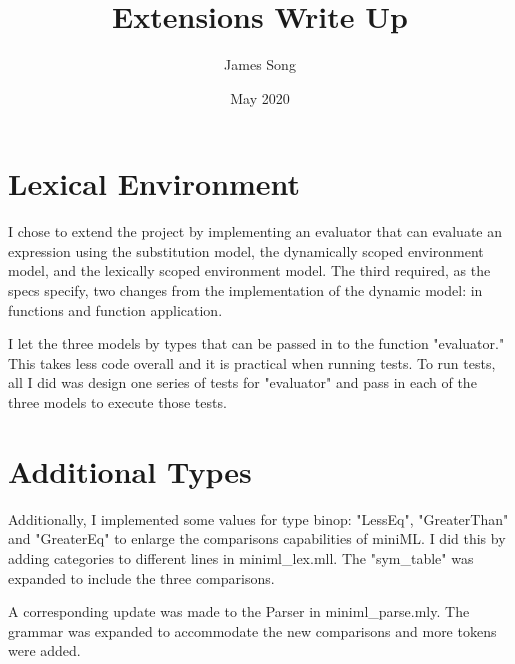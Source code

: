 \documentclass{article}
\title{Extensions Write Up}
\author{James Song}
\date{May 2020}
\begin{document}
\maketitle

\section{Lexical Environment}

I chose to extend the project by implementing an evaluator that can evaluate an expression using the substitution model, the dynamically scoped environment model, and the lexically scoped environment model. The third required, as the specs specify, two changes from the implementation of the dynamic model: in functions and function application. 

I let the three models by types that can be passed in to the function "evaluator." This takes less code overall and it is practical when running tests. To run tests, all I did was design one series of tests for "evaluator" and pass in each of the three models to execute those tests.

\section{Additional Types}
Additionally, I implemented some values for type binop: "LessEq", "GreaterThan" and "GreaterEq" to enlarge the comparisons capabilities of miniML. I did this by adding categories to different lines in miniml\_lex.mll. The "sym\_table" was expanded to include the three comparisons. 

A corresponding update was made to the Parser in miniml\_parse.mly. The grammar was expanded to accommodate the new comparisons and more tokens were added. 
\end{document}
